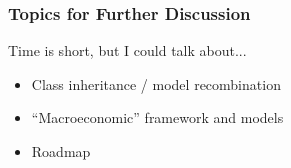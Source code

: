 \documentclass[public]{beamer}\beamerdefaultoverlayspecification{<+->}
\begin{document}
\begin{frame}\label{DiscussionTopics}
  \frametitle{Topics for Further Discussion}

  Time is short, but I could talk about...
  \begin{itemize}
  \item Class inheritance / model recombination \hyperlink{Recombination}{}

  \item ``Macroeconomic'' framework and models \hyperlink{Macroeconomics}{}

  \item Roadmap \hyperlink{HARKFuture}{}
  \end{itemize}
\end{frame}
\end{document}
